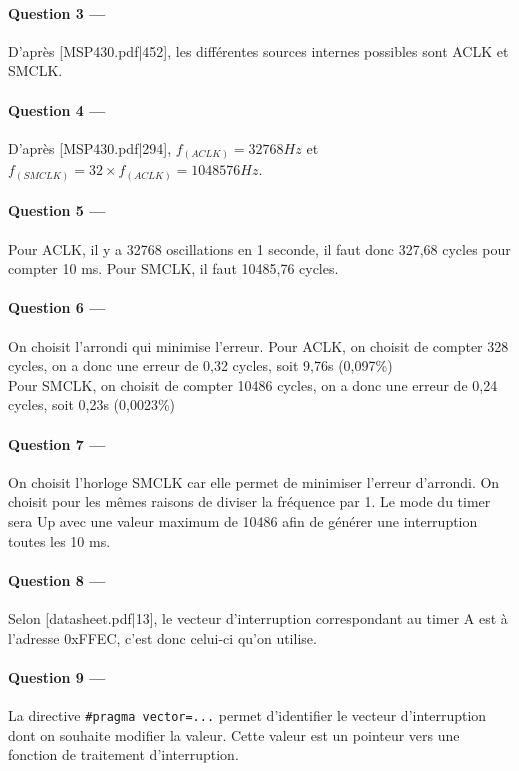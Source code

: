 \documentclass[a4paper,11pt,article]{memoir}
\begin{document}
\paragraph{Question 3 ---}  D'après [MSP430.pdf|452], les différentes sources internes possibles sont ACLK et SMCLK.

\paragraph{Question 4 ---}  D'après [MSP430.pdf|294], $f_(ACLK) = 32768 Hz$ et $f_(SMCLK) = 32 \times f_(ACLK) = 1048576 Hz$.

\paragraph{Question 5 ---}  Pour ACLK, il y a 32768 oscillations en 1 seconde, il faut donc 327,68 cycles pour compter 10 ms. Pour SMCLK, il faut 10485,76 cycles.

\paragraph{Question 6 ---}  On choisit l'arrondi qui minimise l'erreur. Pour ACLK, on choisit de compter 328 cycles, on a donc une erreur de 0,32 cycles, soit 9,76\textmugreek s (0,097\%)\\
Pour SMCLK, on choisit de compter 10486 cycles, on a donc une erreur de 0,24 cycles, soit 0,23\textmugreek s (0,0023\%)

\paragraph{Question 7 ---}  On choisit l'horloge SMCLK car elle permet de minimiser l'erreur d'arrondi. On choisit pour les mêmes raisons de diviser la fréquence par 1. Le mode du timer sera Up avec une valeur maximum de 10486 afin de générer une interruption toutes les 10 ms.

\paragraph{Question 8 ---}  Selon [datasheet.pdf|13], le vecteur d'interruption correspondant au timer A est à l'adresse 0xFFEC, c'est donc celui-ci qu'on utilise.

\paragraph{Question 9 ---}  La directive \verb|#pragma vector=...| permet d'identifier le vecteur d'interruption dont on souhaite modifier la valeur. Cette valeur est un pointeur vers une fonction de traitement d'interruption.
\end{document}
